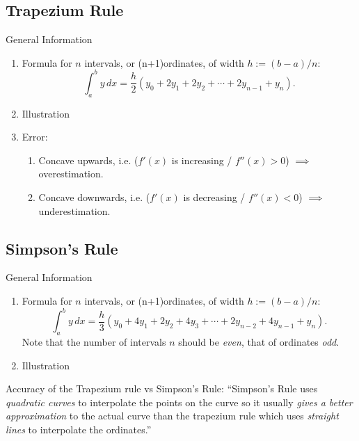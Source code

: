 \documentclass[oneside]{book}
\begin{document}
\subsection{Trapezium Rule}
\begin{stbox}{General Information}
    \begin{enumerate}
      \item Formula for \(n\) intervals, or (n+1)ordinates, of width \(h:=(b-a)/n\): 
      \[\int_{a}^{b}y\,dx=\frac{h}{2}(y_0+2y_1+2y_2+\cdots+2y_{n-1}+y_n).\]
      \item Illustration
      \begin{center}
        
      \end{center}
    \item Error: 
    \begin{enumerate}
      \item Concave upwards, i.e. (\(f'(x)\) is increasing / \(f''(x)>0\)) \(\implies\) overestimation.
      \item Concave downwards, i.e. (\(f'(x)\) is decreasing / \(f''(x)<0\)) \(\implies\) underestimation.
    \end{enumerate}
    \end{enumerate}
    \end{stbox}
    \newpage
    \subsection{Simpson's Rule}
    \begin{stbox}{General Information}
      \begin{enumerate}
        \item Formula for \(n\) intervals, or (n+1)ordinates, of width \(h:=(b-a)/n\):
        \[\int_{a}^{b}y\,dx=\frac{h}{3}(y_0+4y_1+2y_2+4y_3+\cdots+2y_{n-2}+4y_{n-1}+y_n).\]
        Note that the number of intervals \(n\) should be \emph{even}, that of ordinates \emph{odd}.
        \item Illustration
        \begin{center}
          
        \end{center}
      \end{enumerate}
    \end{stbox}
      \begin{note}
        Accuracy of the Trapezium rule vs Simpson's Rule:
        ``Simpson's Rule uses \emph{quadratic curves} to interpolate the points on the curve so it usually \emph{gives a better approximation} to the actual curve than the trapezium rule which uses \emph{straight lines} to interpolate the ordinates.''
      \end{note}
\end{document}
